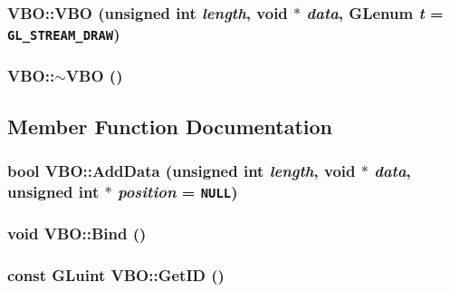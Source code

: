 \hypertarget{class_v_b_o_d4441d2606b0e217063d3ef7b88d9d67}{
\subsubsection[{VBO}]{\setlength{\rightskip}{0pt plus 5cm}VBO::VBO (unsigned int {\em length}, \/  void $\ast$ {\em data}, \/  GLenum {\em t} = {\tt GL\_\-STREAM\_\-DRAW})}}
\label{class_v_b_o_d4441d2606b0e217063d3ef7b88d9d67}


\hypertarget{class_v_b_o_a1f948bfcd73951c3a8369f5443f4678}{
\subsubsection[{$\sim$VBO}]{\setlength{\rightskip}{0pt plus 5cm}VBO::$\sim$VBO ()}}
\label{class_v_b_o_a1f948bfcd73951c3a8369f5443f4678}




\subsection{Member Function Documentation}
\hypertarget{class_v_b_o_867f6324a099128d6449c2d1036393e2}{
\subsubsection[{AddData}]{\setlength{\rightskip}{0pt plus 5cm}bool VBO::AddData (unsigned int {\em length}, \/  void $\ast$ {\em data}, \/  unsigned int $\ast$ {\em position} = {\tt NULL})}}
\label{class_v_b_o_867f6324a099128d6449c2d1036393e2}


\hypertarget{class_v_b_o_f7ce2a599aecbcf9b97d3f30b294a0b2}{
\subsubsection[{Bind}]{\setlength{\rightskip}{0pt plus 5cm}void VBO::Bind ()}}
\label{class_v_b_o_f7ce2a599aecbcf9b97d3f30b294a0b2}


\hypertarget{class_v_b_o_f5e2f7610be062e07be7ce68ccaabfb7}{
\subsubsection[{GetID}]{\setlength{\rightskip}{0pt plus 5cm}const GLuint VBO::GetID ()}}
\label{class_v_b_o_f5e2f7610be062e07be7ce68ccaabfb7}


